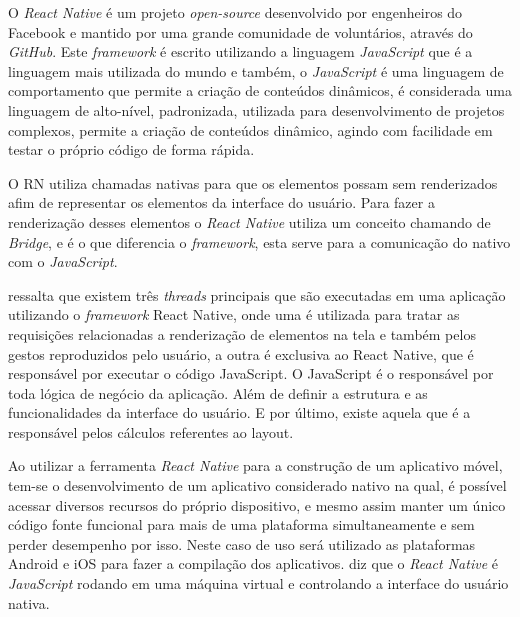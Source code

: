 O \textit{React Native} é um projeto \textit{open-source} desenvolvido por engenheiros do Facebook e mantido por uma grande comunidade de voluntários, através do \textit{GitHub}. Este \textit{framework} é escrito utilizando a linguagem \textit{JavaScript} que é a linguagem mais utilizada do mundo e também, o \textit{JavaScript} é uma linguagem de comportamento que permite a criação de conteúdos dinâmicos, é considerada uma linguagem de alto-nível, padronizada, utilizada para desenvolvimento de projetos complexos, permite a criação de conteúdos dinâmico, agindo com facilidade em testar o próprio código de forma rápida. \cite{javascript}

O RN utiliza chamadas nativas para que os elementos possam sem renderizados afim de representar os elementos da interface do usuário. Para fazer a renderização desses elementos o \textit{React Native} utiliza um conceito chamando de \textit{Bridge}, e é o que diferencia o \textit{framework}, esta serve para a comunicação do nativo com o \textit{JavaScript}.

 ressalta que existem três \textit{threads} principais que são executadas em uma aplicação utilizando o \textit{framework} React Native, onde uma é utilizada para tratar as requisições relacionadas a renderização de elementos na tela e também pelos gestos reproduzidos pelo usuário, a outra é exclusiva ao React Native, que é responsável por executar o código JavaScript. O JavaScript é o responsável por toda lógica de negócio da aplicação. Além de definir a estrutura e as funcionalidades da interface do usuário. E por último, existe aquela que é a responsável pelos cálculos referentes ao layout. 


Ao utilizar a ferramenta \textit{React Native} para a construção de um aplicativo móvel, tem-se o desenvolvimento de um aplicativo considerado nativo na qual, é possível acessar diversos recursos do próprio dispositivo, e mesmo assim manter um único código fonte funcional para mais de uma plataforma simultaneamente e sem perder desempenho por isso. Neste caso de uso será utilizado as plataformas Android e iOS para fazer a compilação dos aplicativos.
 diz que o \textit{React Native} é \textit{JavaScript} rodando em uma máquina virtual e controlando a interface do usuário nativa.



